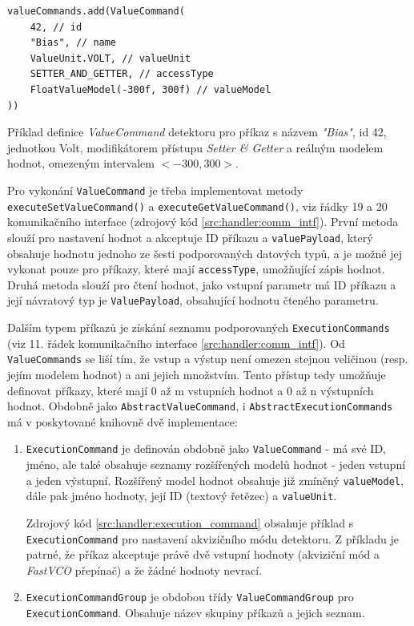 \begin{code}[h!]
\begin{verbatim}
valueCommands.add(ValueCommand(
    42, // id
    "Bias", // name
    ValueUnit.VOLT, // valueUnit
    SETTER_AND_GETTER, // accessType
    FloatValueModel(-300f, 300f) // valueModel
))
\end{verbatim}
\caption{Příklad definice \textit{ValueCommand} detektoru pro příkaz s názvem \textit{"Bias"}, id 42, jednotkou Volt, modifikátorem přístupu \textit{Setter \& Getter} a reálným modelem hodnot, omezeným intervalem $<-300,300>$.}
\label{src:handler:value_command}
\end{code}

Pro vykonání \texttt{ValueCommand} je třeba implementovat metody \texttt{executeSetValueCommand()} a \texttt{executeGetValueCommand()}, viz řádky 19 a 20 komunikačního interface (zdrojový kód \ref{src:handler:comm_intf}). První metoda slouží pro nastavení hodnot a akceptuje ID příkazu a \texttt{valuePayload}, který obsahuje hodnotu jednoho ze šesti podporovaných datových typů, a je možné jej vykonat pouze pro příkazy, které mají \texttt{accessType}, umožňující zápis hodnot. Druhá metoda slouží pro čtení hodnot, jako vstupní parametr má ID příkazu a její návratový typ je \texttt{ValuePayload}, obsahující hodnotu čteného parametru.

Dalším typem příkazů je získání seznamu podporovaných \texttt{ExecutionCommands} (viz 11. řádek komunikačního interface \ref{src:handler:comm_intf}). Od \texttt{ValueCommands} se liší tím, že vstup a výstup není omezen stejnou veličinou (resp. jejím modelem hodnot) a ani jejich množstvím. Tento přístup tedy umožňuje definovat příkazy, které mají 0 až m vstupních hodnot a 0 až n výstupních hodnot. Obdobně jako \texttt{AbstractValueCommand}, i \texttt{AbstractExecutionCommands} má v poskytované knihovně dvě implementace:
\begin{enumerate}[label=(\roman*)]
	\item \texttt{ExecutionCommand} je definován obdobně jako \texttt{ValueCommand} - má své ID, jméno, ale také obsahuje seznamy rozšířených modelů hodnot - jeden vstupní a jeden výstupní. Rozšířený model hodnot obsahuje již zmíněný \texttt{valueModel}, dále pak jméno hodnoty, její ID (textový řetězec) a \texttt{valueUnit}.
	
	Zdrojový kód \ref{src:handler:execution_command} obsahuje příklad s \texttt{ExecutionCommand} pro nastavení akvizičního módu detektoru. Z příkladu je patrné, že příkaz akceptuje právě dvě vstupní hodnoty (akviziční mód a \textit{FastVCO} přepínač) a že žádné hodnoty nevrací.
	
	\item \texttt{ExecutionCommandGroup} je obdobou třídy \texttt{ValueCommandGroup} pro \texttt{ExecutionCommand}. Obsahuje název skupiny příkazů a jejich seznam.
\end{enumerate}

